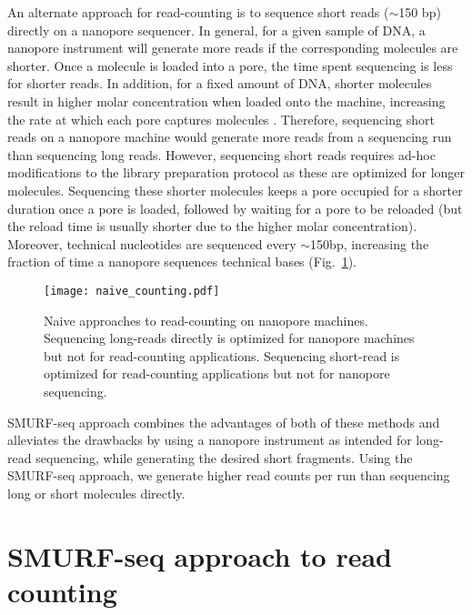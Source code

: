 An alternate approach for read-counting is to sequence short reads
($\sim$150 bp) directly on a nanopore sequencer.
In general, for a given sample of DNA, a nanopore instrument will
generate more reads if the corresponding molecules are shorter.  Once a
molecule is loaded into a pore, the time spent sequencing is less for
shorter reads. In addition, for a fixed amount of DNA, shorter molecules
result in higher molar concentration when loaded onto the machine,
increasing the rate at which each pore captures molecules
\citep{muthukumar2010theory,wanunu2008dna}. Therefore, sequencing short
reads on a nanopore machine would generate more reads from a sequencing
run than sequencing long reads.
However, sequencing short reads requires ad-hoc modifications to the
library preparation protocol as these are optimized for longer
molecules.  Sequencing these shorter molecules keeps a pore occupied for
a shorter duration once a pore is loaded, followed by waiting for a pore
to be reloaded (but the reload time is usually shorter due to the higher
molar concentration). Moreover, technical nucleotides are sequenced
every $\sim$150bp, increasing the fraction of time a nanopore sequences
technical bases (Fig.~\ref{naive_counting}).

\begin{figure}[b!]
\centering
\texttt{[image: naive\_counting.pdf]}
\caption[Naive approaches to read-counting on nanopore machines]{
  Naive approaches to read-counting on nanopore machines.
  Sequencing long-reads directly is optimized for nanopore machines but
  not for read-counting applications.
  Sequencing short-read is optimized for read-counting applications but
  not for nanopore sequencing.}
\label{naive_counting}
\end{figure}

SMURF-seq approach combines the advantages of both of these methods
and alleviates the drawbacks by using a nanopore instrument as
intended for long-read sequencing, while generating the desired short
fragments. Using the SMURF-seq approach, we generate higher read counts
per run than sequencing long or short molecules directly.


\section{SMURF-seq approach to read counting}

